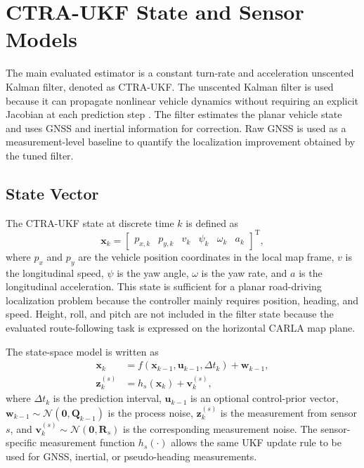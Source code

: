 \documentclass[conference]{IEEEtran}
\begin{document}
\section{CTRA-UKF State and Sensor Models}
\label{sec:ukf_model}

The main evaluated estimator is a constant turn-rate and acceleration unscented Kalman filter, denoted as CTRA-UKF. The unscented Kalman filter is used because it can propagate nonlinear vehicle dynamics without requiring an explicit Jacobian at each prediction step \cite{julier2004unscented,wan2000unscented}. The filter estimates the planar vehicle state and uses GNSS and inertial information for correction. Raw GNSS is used as a measurement-level baseline to quantify the localization improvement obtained by the tuned filter.

\subsection{State Vector}

The CTRA-UKF state at discrete time $k$ is defined as
\begin{equation}
\mathbf{x}_k =
\begin{bmatrix}
p_{x,k} & p_{y,k} & v_k & \psi_k & \omega_k & a_k
\end{bmatrix}^{\mathrm{T}},
\label{eq:state_vector}
\end{equation}
where $p_x$ and $p_y$ are the vehicle position coordinates in the local map frame, $v$ is the longitudinal speed, $\psi$ is the yaw angle, $\omega$ is the yaw rate, and $a$ is the longitudinal acceleration. This state is sufficient for a planar road-driving localization problem because the controller mainly requires position, heading, and speed. Height, roll, and pitch are not included in the filter state because the evaluated route-following task is expressed on the horizontal CARLA map plane.

The state-space model is written as
\begin{align}
\mathbf{x}_k &= f(\mathbf{x}_{k-1},\mathbf{u}_{k-1},\Delta t_k) + \mathbf{w}_{k-1},
\label{eq:state_model}\\
\mathbf{z}_k^{(s)} &= h_s(\mathbf{x}_k) + \mathbf{v}_k^{(s)},
\label{eq:measurement_model}
\end{align}
where $\Delta t_k$ is the prediction interval, $\mathbf{u}_{k-1}$ is an optional control-prior vector, $\mathbf{w}_{k-1}\sim\mathcal{N}(\mathbf{0},\mathbf{Q}_{k-1})$ is the process noise, $\mathbf{z}_k^{(s)}$ is the measurement from sensor $s$, and $\mathbf{v}_k^{(s)}\sim\mathcal{N}(\mathbf{0},\mathbf{R}_s)$ is the corresponding measurement noise. The sensor-specific measurement function $h_s(\cdot)$ allows the same UKF update rule to be used for GNSS, inertial, or pseudo-heading measurements.
\end{document}
